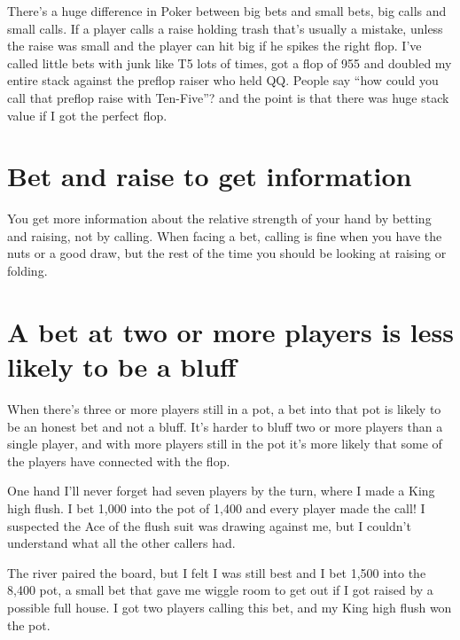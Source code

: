 There's a huge difference in Poker between big bets and small bets,
big calls and small calls. If a player calls a raise holding trash
that's usually a mistake, unless the raise was small and the player
can hit big if he spikes the right flop. I've called little bets
with junk like T5 lots of times, got a flop of 955 and doubled my entire
stack against the preflop raiser who held QQ. People say ``how could
you call that preflop raise with Ten-Five''? and the point is that
there was huge stack value if I got the perfect flop.


\section{Bet and raise to get information}

You get more information about the relative strength of your hand
by betting and raising, not by calling. When facing a bet, calling is
fine when you have the nuts or a good draw, but the rest of the time
you should be looking at raising or folding.

\section{A bet at two or more players is less likely to be a bluff}

When there's three or more players still in a pot, a bet into that
pot is likely to be an honest bet and not a bluff. It's harder to bluff
two or more players than a single player, and with more players still in
the pot it's more likely that some of the players have connected with
the flop.

One hand I'll never forget had seven players by the turn, where I made
a King high flush. I bet 1,000 into the pot of 1,400 and every player
made the call! I suspected the Ace of the flush suit was drawing against
me, but I couldn't understand what all the other callers had.

The river paired the board, but I felt I was still best and I bet
1,500 into the 8,400 pot, a small bet that gave me wiggle room to get
out if I got raised by a possible full house. I got two players calling
this bet, and my King high flush won the pot.

